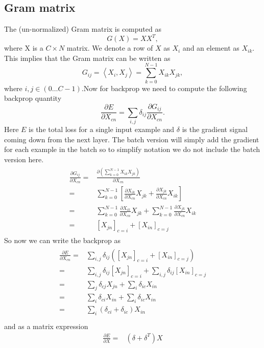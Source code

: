 \documentclass[a4paper]{article}
\begin{document}
\subsection{Gram matrix}
The (un-normalized) Gram matrix is computed as
\begin{equation}
G(X)=XX^T,
\end{equation}
where X is a $C\times N$ matrix. We denote a row of $X$ as $X_i$ and an element as $X_{ik}$. This implies that the Gram matrix can be written as
\begin{equation}
G_{ij}=\left \langle X_i,X_j \right \rangle = \sum_{k=0}^{N-1} X_{ik} X_{jk},
\end{equation}
where $i,j \in (0\dots C-1)$.Now for backprop we need to compute the following backprop quantity
\begin{equation}
\frac{\partial{E}}{\partial{X_{cn}}} = \sum_{i,j}\delta_{ij} \frac{\partial{G_{ij}}}{\partial{X_{cn}}}.
\end{equation}
Here $E$ is the total loss for a single input example and $\delta$ is the gradient signal coming down from the next layer. The batch version will simply add the gradient for each example in the batch so to simplify notation we do not include the batch version here. 
\begin{align}
\begin{split}
 \frac{\partial{G_{ij}}}{\partial{X_{cn}}} = & \frac{ \partial \left (\sum_{k=0}^{N-1}X_{ik}X_{jk}\right )  }{\partial{X_{cn}}}\\ 
 = & \sum_{k=0}^{N-1} \left [ \frac{\partial{X_{ik}}}{\partial{X_{cn}}} X_{jk} + \frac{\partial{X_{jk}}}{\partial{X_{cn}}} X_{ik} \right ]\\ 
 = & \sum_{k=0}^{N-1} \frac{\partial{X_{ik}}}{\partial{X_{cn}}} X_{jk} + \sum_{k=0}^{N-1} \frac{\partial{X_{jk}}}{\partial{X_{cn}}} X_{ik}\\ 
 = & \left [ X_{jn} \right ]_{c=i} + \left [ X_{in} \right ]_{c=j} 
\end{split}
\end{align}
So now we can write the backprop as
\begin{align}
\begin{split}
 \frac{\partial{E}}{\partial{X_{cn}}}  = &  
 \sum_{i,j} \delta_{ij} \left (\left [ X_{jn} \right ]_{c=i} + \left [ X_{in} \right ]_{c=j} \right )\\ 
  = & \sum_{i,j} \delta_{ij} \left [ X_{jn} \right ]_{c=i} + \sum_{i,j} \delta_{ij} \left [ X_{in} \right ]_{c=j} \\ 
  = &  \sum_{j} \delta_{cj} X_{jn} + \sum_{i} \delta_{ic}  X_{in} \\
  = &  \sum_{i} \delta_{ci} X_{in} + \sum_{i} \delta_{ic}  X_{in} \\
  = &  \sum_{i}  \left ( \delta_{ci}  + \delta_{ic}  \right) X_{in}\\
  \end{split}
\end{align}
and as a matrix expression
\begin{align}
 \frac{\partial{E}}{\partial{X}}  = & (\delta +\delta^T)X
\end{align}

\newpage


    
\end{document}
